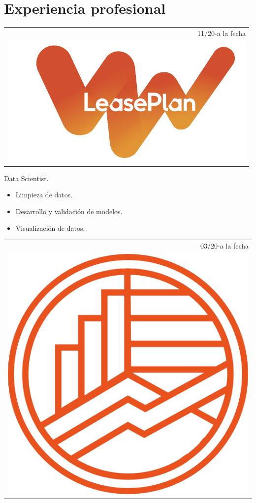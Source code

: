 \documentclass[]{friggeri-cv}
\begin{document}
\section{Experiencia profesional}
\vspace{-0.4cm}
\begin{entrylist}
\entry
   {   \begin{tabular}{r}
    		11/20-a la fecha\\
     		\includegraphics[scale=0.17]{img/LeasePlan.png}
	\end{tabular}
    }
    {\vspace{-1.2cm}}
    { }
    {Data Scientist.
    \begin{itemize}
    	\item Limpieza de datos.
    	\item Desarrollo y validación de modelos.
    	\item Visualización de datos.
\end{itemize}}
\entry
   {   \begin{tabular}{r}
    		03/20-a la fecha\\
     		\includegraphics[scale=0.04]{img/Logo_Solo_Figura_Color.png}

\end{tabular}}
\end{entrylist}
\end{document}
